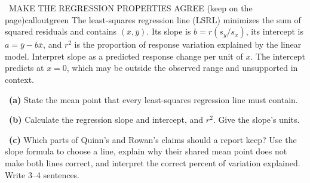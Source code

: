 \documentclass[11pt]{article}
\begin{document}
\begin{callout}{\IconBook\ MAKE THE REGRESSION PROPERTIES AGREE (keep on the page)}{calloutgreen}
The least-squares regression line (LSRL) minimizes the sum of squared residuals and contains
$(\bar x,\bar y)$. Its slope is $b=r(s_y/s_x)$, its intercept is
$a=\bar y-b\bar x$, and $r^2$ is the proportion of response variation explained by the
linear model. Interpret slope as a predicted response change per unit of $x$. The intercept
predicts at $x=0$, which may be outside the observed range and unsupported in context.
\end{callout}

~\textbf{(a)} State the mean point that every least-squares regression line must contain.\par
{}

~\textbf{(b)} Calculate the regression slope and intercept, and $r^2$. Give the slope's units.\par
{}

~\textbf{(c)} Which parts of Quinn's and Rowan's claims should a report keep? Use the slope formula to choose a line, explain why their shared mean point does not make both lines correct, and interpret the correct percent of variation explained. Write 3--4 sentences.\par
{}
\end{document}
